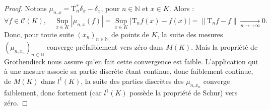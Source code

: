 \documentclass{article}
\theoremstyle{plain}
\begin{document}
\begin{proof}
	Notons $\mu_{n, x}=\mathrm{T}_{n}^{*} \delta_{x}-\delta_{x}$, pour $n \in \mathbb{N}$ et $x \in K$. Alors :
	\begin{equation*}
		\forall f \in \mathscr{C}(K), \quad \underset{x \in K}{\operatorname{Sup}} \left|\mu_{n, x}(f)\right|=\underset{x \in K}{\operatorname{Sup}}\left|\mathrm{T}_{n} f(x)-f(x)\right|=\left\|\mathrm{T}_{n} f - f\right\|\underset{n \to + \infty}{\longrightarrow} 0.
	\end{equation*}
	Donc, pour toute suite $\left(x_{n}\right)_{n \in \mathbb{N}}$ de points de $K$, la suite des mesures $\left(\mu_{n, x_{n}}\right)_{n \in \mathbb{N}}$ converge préfaiblement vers zéro dans $M(K)$. Mais la propriété de Grothendieck nous assure qu'en fait cette convergence est faible. L'application qui à une mesure associe sa partie discrète étant continue, donc faiblement continue, de $M(K)$ dans $l^{1}(K)$, la suite des parties discrètes des $\mu_{n, x_{n}}$ converge faiblement, donc fortement (car $l^{1}(K)$ possède la propriété de Schur) vers zéro.
	

\end{proof}
\end{document}
